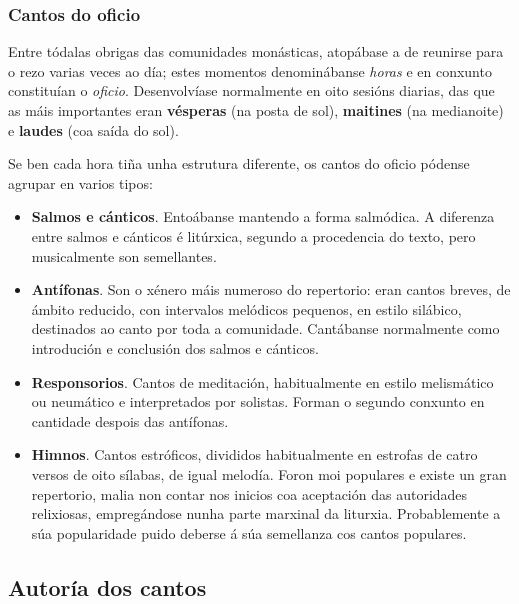 \documentclass[spanish, a4paper,nobind]{templates/ociamthesis}
\begin{document}
\hypertarget{cantos-do-oficio}{%
\subsubsection*{Cantos do oficio}\label{cantos-do-oficio}}

Entre tódalas obrigas das comunidades monásticas, atopábase a de reunirse para o rezo varias veces ao día; estes momentos denominábanse \emph{horas} e en conxunto constituían o \emph{oficio}. Desenvolvíase normalmente en oito sesións diarias, das que as máis importantes eran \textbf{vésperas} (na posta de sol), \textbf{maitines} (na medianoite) e \textbf{laudes} (coa saída do sol).

Se ben cada hora tiña unha estrutura diferente, os cantos do oficio pódense agrupar en varios tipos:

\begin{itemize}
\item
  \textbf{Salmos e cánticos}. Entoábanse mantendo a forma salmódica. A diferenza entre salmos e cánticos é litúrxica, segundo a procedencia do texto, pero musicalmente son semellantes.
\item
  \textbf{Antífonas}. Son o xénero máis numeroso do repertorio: eran cantos breves, de ámbito reducido, con intervalos melódicos pequenos, en estilo silábico, destinados ao canto por toda a comunidade. Cantábanse normalmente como introdución e conclusión dos salmos e cánticos.
\item
  \textbf{Responsorios}. Cantos de meditación, habitualmente en estilo melismático ou neumático e interpretados por solistas. Forman o segundo conxunto en cantidade despois das antífonas.
\item
  \textbf{Himnos}. Cantos estróficos, divididos habitualmente en estrofas de catro versos de oito sílabas, de igual melodía. Foron moi populares e existe un gran repertorio, malia non contar nos inicios coa aceptación das autoridades relixiosas, empregándose nunha parte marxinal da liturxia. Probablemente a súa popularidade puido deberse á súa semellanza cos cantos populares.
\end{itemize}

\hypertarget{autoruxeda-dos-cantos}{%
\subsection*{Autoría dos cantos}\label{autoruxeda-dos-cantos}}
\end{document}
